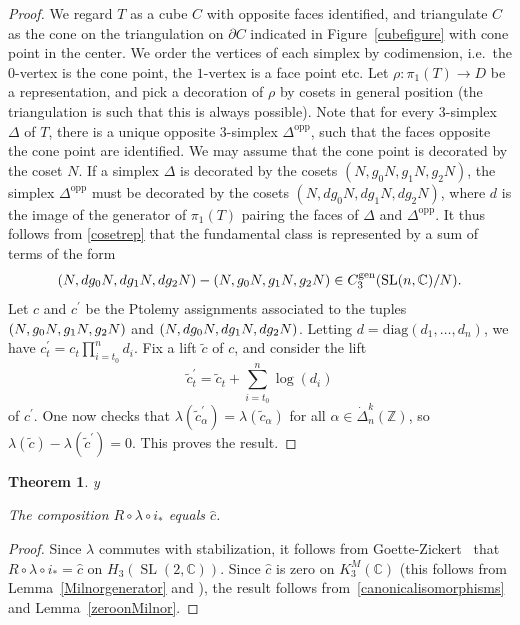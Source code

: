 \documentclass[11pt]{amsart}
\newtheorem{theorem}{Theorem}[section]
\theoremstyle{definition}
\numberwithin{equation}{section}
\def\printname#1{
        \if\draft y
                \smash{\makebox[0pt]{\hspace{-0.5in}
                        \raisebox{8pt}{\tt\tiny #1}}}
        \fi
}
\def\lbl#1{\label{#1}\printname{#1}}
\DeclareMathOperator{\SL}{SL}
\DeclareMathOperator{\gen}{gen}
\DeclareMathOperator{\diag}{diag}
\newcommand{\C}{\mathbb C}
\newcommand{\Z}{\mathbb Z}
\def\diag{\mathrm{diag}}
\newcommand{\comma}{,\penalty300}
\begin{document}
\begin{proof}
We regard $T$ as a cube $C$ with opposite faces identified, and triangulate 
$C$ as the cone on the triangulation on $\partial C$ indicated in 
Figure~\ref{cubefigure} with cone point in the center. We order the vertices 
of each simplex by codimension, i.e.~the $0$-vertex is the cone point, the 
$1$-vertex is a face point etc. Let $\rho\colon\pi_1(T)\to D$ be a 
representation, and pick a decoration of $\rho$ by cosets in general 
position (the triangulation is such that this is always possible). 
Note that for every $3$-simplex $\Delta$ of $T$, there is a unique opposite 
$3$-simplex $\Delta^{\text{opp}}$, such that the faces opposite the cone point 
are identified. We may assume that the cone point is decorated by the coset 
$N$. If a simplex $\Delta$ is decorated by the cosets $(N,g_0N,g_1N,g_2N)$, 
the simplex $\Delta^{\text{opp}}$ must be decorated by the cosets 
$(N,dg_0N,dg_1N,dg_2N)$, where $d$ is the image of the generator of 
$\pi_1(T)$ pairing the faces of $\Delta$ and $\Delta^{\text{opp}}$. It thus 
follows from \eqref{cosetrep} that the fundamental class is represented by 
a sum of terms of the form
\begin{equation}
\lbl{terms}
(N,dg_0N,dg_1N,dg_2N)-(N,g_0N,g_1N,g_2N)\in C_3^{\gen}(\SL(n,\C)/N).
\end{equation}
Let $c$ and $c^\prime$ be the Ptolemy assignments associated to the tuples 
$(N\comma g_0N\comma g_1N\comma g_2N)$ and $(N\comma dg_0N\comma dg_1N\comma dg_2N)$. Letting 
$d=\diag(d_1,\dots,d_n)$, we have $c_t^\prime=c_t\prod_{i=t_0}^n d_i$. Fix a lift 
$\widetilde c$ of $c$, and consider the lift  
\begin{equation}
\widetilde c^\prime_t=\widetilde c_t+\sum_{i=t_0}^n\log(d_i)
\end{equation}
of $c^\prime$. One now checks that $\lambda(\widetilde c_\alpha^\prime)
=\lambda(\widetilde c_\alpha)$ for all $\alpha\in\dot\Delta^k_n(\Z)$, so 
$\lambda(\widetilde c)-\lambda(\widetilde c^\prime)=0$. This proves the result.
\end{proof}

\begin{theorem}
\lbl{formulaforchat} 
The composition $R\circ\lambda\circ i_*$ equals $\widehat c$.
\end{theorem}

\begin{proof}
Since $\lambda$ commutes with stabilization, it follows from Goette-Zickert~\cite{GoetteZickert} that $R\circ\lambda\circ i_*=\widehat c$ 
on $H_3(\SL(2,\C))$. Since $\widehat c$ is zero on $K_3^M(\C)$ (this follows 
from Lemma~\ref{Milnorgenerator} and 
\cite[Theorem~8.22]{CheegerSimons}), the result follows from~\eqref{canonicalisomorphisms} and
Lemma~\ref{zeroonMilnor}.
\end{proof}
\end{document}
